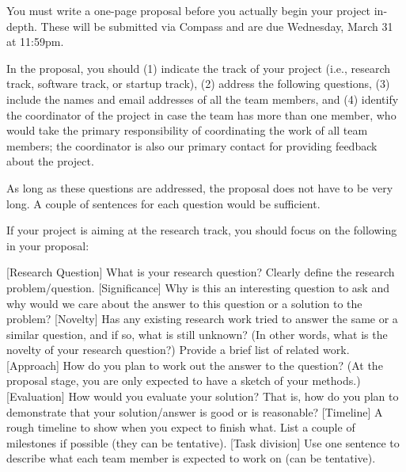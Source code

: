 

You must write a one-page proposal before you actually begin your project in-depth. These will be submitted via Compass and are due Wednesday, March 31 at 11:59pm.

In the proposal, you should (1) indicate the track of your project (i.e., research track, software track, or startup track), (2) address the following questions, (3) include the names and email addresses of all the team members, and (4) identify the coordinator of the project in case the team has more than one member, who would take the primary responsibility of coordinating the work of all team members; the coordinator is also our primary contact for providing feedback about the project.

As long as these questions are addressed, the proposal does not have to be very long. A couple of sentences for each question would be sufficient.

If your project is aiming at the research track, you should focus on the following in your proposal:

[Research Question] What is your research question? Clearly define the research problem/question.
[Significance] Why is this an interesting question to ask and why would we care about the answer to this question or a solution to the problem?
[Novelty] Has any existing research work tried to answer the same or a similar question, and if so, what is still unknown? (In other words, what is the novelty of your research question?) Provide a brief list of related work.
[Approach] How do you plan to work out the answer to the question? (At the proposal stage, you are only expected to have a sketch of your methods.)
[Evaluation] How would you evaluate your solution? That is, how do you plan to demonstrate that your solution/answer is good or is reasonable?
[Timeline] A rough timeline to show when you expect to finish what. List a couple of milestones if possible (they can be tentative).
[Task division] Use one sentence to describe what each team member is expected to work on (can be tentative). 